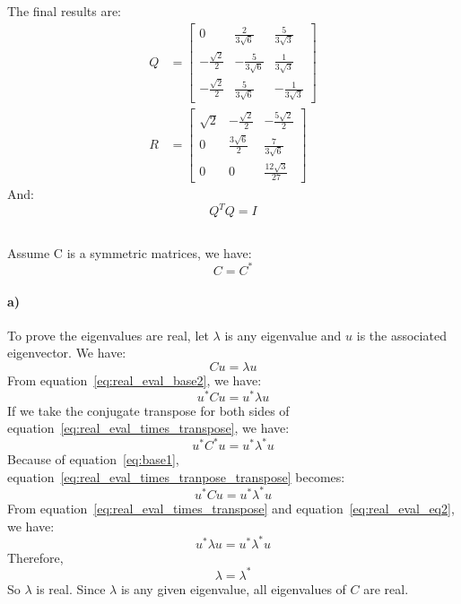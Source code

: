 \documentclass{article}
\begin{document}
The final results are:
\begin{align*}
Q &= \begin{bmatrix}
0                   & \frac{2}{3\sqrt{6}}  & \frac{5}{3\sqrt{3}} \\[0.5em]
-\frac{\sqrt{2}}{2} & -\frac{5}{3\sqrt{6}} & \frac{1}{3\sqrt{3}} \\[0.5em]
-\frac{\sqrt{2}}{2} & \frac{5}{3\sqrt{6}}  & -\frac{1}{3\sqrt{3}}
\end{bmatrix}\\
R &= \begin{bmatrix}
\sqrt{2} & -\frac{\sqrt{2}}{2}  & -\frac{5\sqrt{2}}{2} \\[0.5em]
0        & \frac{3\sqrt{6}}{2} & \frac{7}{3\sqrt{6}} \\[0.5em]
0        & 0  & \frac{12\sqrt{3}}{27}
\end{bmatrix}
\end{align*}
And:
\begin{equation*}
Q^T Q = I
\end{equation*}


\subsection{}
Assume C is a symmetric matrices, we have:
\begin{equation}
\label{eq:base1}
C = C^*
\end{equation}

\paragraph{a)} To prove the eigenvalues are real, let $\lambda$ is any eigenvalue and $u$ is the associated eigenvector. We have:
\begin{equation}
\label{eq:real_eval_base2}
Cu = \lambda u
\end{equation}
From equation~\ref{eq:real_eval_base2}, we have:
\begin{equation}
\label{eq:real_eval_times_transpose}
u^*Cu = u^* \lambda u
\end{equation}
If we take the conjugate transpose for both sides of equation~\ref{eq:real_eval_times_transpose}, we have:
\begin{equation}
\label{eq:real_eval_times_tranpose_transpose}
u^* C^* u = u^* \lambda ^ * u
\end{equation}
Because of equation~\ref{eq:base1}, equation~\ref{eq:real_eval_times_tranpose_transpose} becomes:
\begin{equation}
\label{eq:real_eval_eq2}
u^* C u = u^* \lambda ^ * u
\end{equation}
From equation~\ref{eq:real_eval_times_transpose} and equation~\ref{eq:real_eval_eq2}, we have:
\begin{equation}
u^* \lambda u = u^* \lambda ^ * u
\end{equation}
Therefore,
\begin{equation}
\label{eq:lambda=lambda*}
\lambda= \lambda ^ *
\end{equation}
So $\lambda$ is real. Since $\lambda$ is any given eigenvalue, all eigenvalues of $C$ are real.
\end{document}
